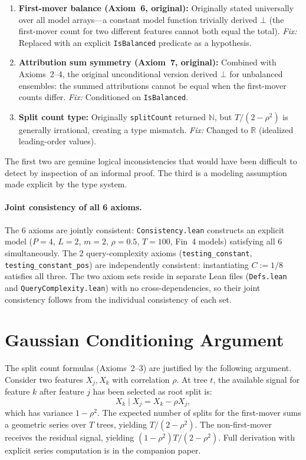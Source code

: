 \documentclass{article}
\begin{document}
\begin{enumerate}
\item \textbf{First-mover balance (Axiom~6, original):}
  Originally stated universally over all model arrays---a constant
  model function trivially derived $\bot$ (the first-mover count for
  two different features cannot both equal the total). \emph{Fix:}
  Replaced with an explicit \texttt{IsBalanced} predicate as a
  hypothesis.

\item \textbf{Attribution sum symmetry (Axiom~7, original):}
  Combined with Axioms~2--4, the original unconditional version
  derived $\bot$ for unbalanced ensembles: the summed attributions
  cannot be equal when the first-mover counts differ. \emph{Fix:}
  Conditioned on \texttt{IsBalanced}.

\item \textbf{Split count type:}
  Originally \texttt{splitCount} returned $\mathbb{N}$, but
  $T/(2-\rho^2)$ is generally irrational, creating a type mismatch.
  \emph{Fix:} Changed to $\mathbb{R}$ (idealized leading-order values).
\end{enumerate}

The first two are genuine logical inconsistencies that would have been
difficult to detect by inspection of an informal proof. The third is a
modeling assumption made explicit by the type system.

\paragraph{Joint consistency of all 6 axioms.}
The 6 axioms are jointly consistent: \texttt{Consistency.lean}
constructs an explicit model ($P{=}4$, $L{=}2$, $m{=}2$, $\rho{=}0.5$,
$T{=}100$, Fin~4 models) satisfying all 6 simultaneously.
The 2 query-complexity axioms (\texttt{testing\_constant},
\texttt{testing\_constant\_pos})
are independently consistent: instantiating $C := 1/8$ satisfies all three.
The two axiom sets reside in separate Lean files
(\texttt{Defs.lean} and \texttt{QueryComplexity.lean}) with no
cross-dependencies, so their joint consistency follows from the
individual consistency of each set.

\section{Gaussian Conditioning Argument}

The split count formulas (Axioms~2--3) are justified by the following
argument. Consider two features $X_j, X_k$ with correlation $\rho$.
At tree $t$, the available signal for feature $k$ after feature $j$
has been selected as root split is:
\[
  X_k \mid X_j = X_k - \rho X_j,
\]
which has variance $1 - \rho^2$. The expected number of splits for the
first-mover sums a geometric series over $T$ trees, yielding
$T/(2 - \rho^2)$. The non-first-mover receives the residual signal,
yielding $(1-\rho^2)T/(2-\rho^2)$. Full derivation with explicit
series computation is in the companion paper.
\end{document}
